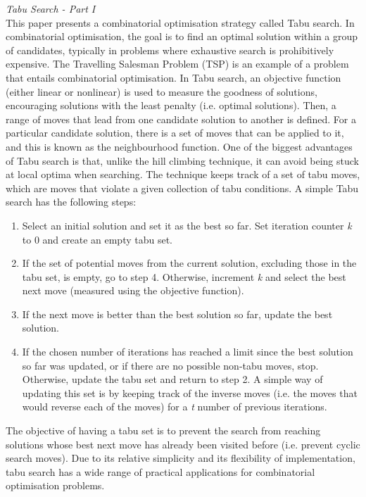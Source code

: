 \textit{Tabu Search - Part I \cite{glover1989tabu}}\\
This paper presents a combinatorial optimisation strategy called Tabu search. In combinatorial optimisation, the goal is to find an optimal solution within a group
of candidates, typically in problems where exhaustive search is prohibitively expensive. The Travelling Salesman Problem (TSP) is an example of a problem that entails
combinatorial optimisation. In Tabu search, an objective function (either linear or nonlinear) is used to measure the goodness of solutions, encouraging solutions with
the least penalty (i.e. optimal solutions). Then, a range of moves that lead from one candidate solution to another is defined. For a particular candidate solution,
there is a set of moves that can be applied to it, and this is known as the neighbourhood function. One of the biggest advantages of Tabu search is that, unlike the
hill climbing technique, it can avoid being stuck at local optima when searching. The technique keeps track of a set of tabu moves, which are moves that violate a given
collection of tabu conditions. A simple Tabu search has the following steps:

\begin{enumerate}
 \item Select an initial solution and set it as the best so far. Set iteration counter \textit{k} to 0 and create an empty tabu set.
 \item If the set of potential moves from the current solution, excluding those in the tabu set, is empty, go to step 4. Otherwise, increment \textit{k} and
 select the best next move (measured using the objective function).
 \item If the next move is better than the best solution so far, update the best solution.
 \item If the chosen number of iterations has reached a limit since the best solution so far was updated, or if there are no possible non-tabu moves, stop.
 Otherwise, update the tabu set and return to step 2. A simple way of updating this set is by keeping track of the inverse moves (i.e. the moves that would
 reverse each of the moves) for a \textit{t} number of previous iterations. 
\end{enumerate}

The objective of having a tabu set is to prevent the search from reaching solutions whose best next move has already been visited before (i.e. prevent cyclic
search moves). Due to its relative simplicity and its flexibility of implementation, tabu search has a wide range of practical applications for combinatorial
optimisation problems.

